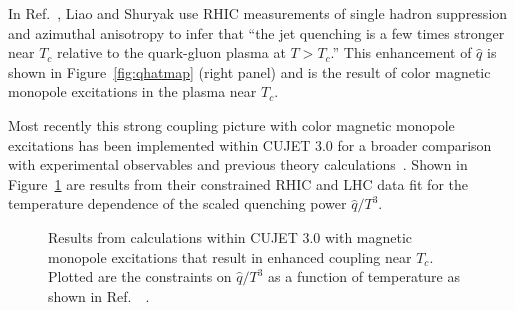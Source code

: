 In Ref.~\cite{Liao:2008dk}, Liao and Shuryak use 
RHIC measurements of single hadron suppression and azimuthal
anisotropy to infer that ``the jet quenching is a few times stronger
near $T_c$ relative to the quark-gluon plasma at $T > T_c$.''  This
enhancement of $\hat{q}$ is shown in Figure~\ref{fig:qhatmap} (right panel)
and is the result of color magnetic monopole excitations in the plasma
near $T_{c}$.   

Most recently this strong coupling picture with color magnetic monopole excitations has been
implemented within CUJET 3.0 for a broader comparison with experimental observables and
previous theory calculations~\cite{Xu:2014tda}.   Shown in Figure~\ref{fig:cujet_monopole} are
results from their constrained RHIC and LHC data fit for the temperature dependence of the scaled
quenching power $\hat{q}/T^{3}$.

\begin{figure}[ht]
  \centering
  \caption[Magnetic Monopole/CUJET 3.0 result for $\hat{q}/T^{3}$ vs temperature, constrained
  by RHIC and LHC \raa data]{Results from calculations within CUJET 3.0 with magnetic monopole
excitations that result in enhanced coupling near $T_{c}$.   Plotted are the constraints on $\hat{q}/T^{3}$ 
as a function of temperature as shown in Ref.~~\cite{Xu:2014tda}.}
  \label{fig:cujet_monopole}
\end{figure}

